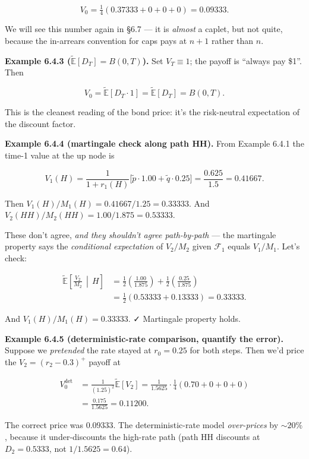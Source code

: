 \documentclass[
  10pt,
  twoside]{book}
\begin{document}
\[V_0 = \tfrac{1}{4}(0.37333 + 0 + 0 + 0) = 0.09333.\]

We will see this number again in §6.7 --- it is \emph{almost} a caplet,
but not quite, because the in-arrears convention for caps pays at
\(n+1\) rather than \(n\).

\textbf{Example 6.4.3 (\(\tilde{\mathbb E}[D_T] = B(0, T)\)).} Set
\(V_T \equiv 1\); the payoff is ``always pay \$1''. Then

\[V_0 = \tilde{\mathbb E}[D_T \cdot 1] = \tilde{\mathbb E}[D_T] = B(0, T).\]

This is the cleanest reading of the bond price: it's the risk-neutral
expectation of the discount factor.

\textbf{Example 6.4.4 (martingale check along path HH).} From Example
6.4.1 the time-1 value at the up node is

\[V_1(H) = \frac{1}{1 + r_1(H)}\bigl[\tilde p \cdot 1.00 + \tilde q \cdot 0.25\bigr] = \frac{0.625}{1.5} = 0.41667.\]

Then \(V_1(H)/M_1(H) = 0.41667 / 1.25 = 0.33333\). And
\(V_2(HH)/M_2(HH) = 1.00 / 1.875 = 0.53333\).

These don't agree, \emph{and they shouldn't agree path-by-path} --- the
martingale property says the \emph{conditional expectation} of
\(V_2/M_2\) given \(\mathcal F_1\) equals \(V_1/M_1\). Let's check:

\[\begin{aligned}
\tilde{\mathbb E}\!\left[\tfrac{V_2}{M_2} \,\middle|\, H\right] &= \tfrac{1}{2}\!\left(\tfrac{1.00}{1.875}\right) + \tfrac{1}{2}\!\left(\tfrac{0.25}{1.875}\right) \\
&= \tfrac{1}{2}(0.53333 + 0.13333) = 0.33333.
\end{aligned}\]

And \(V_1(H)/M_1(H) = 0.33333\). ✓ Martingale property holds.

\textbf{Example 6.4.5 (deterministic-rate comparison, quantify the
error).} Suppose we \emph{pretended} the rate stayed at \(r_0 = 0.25\)
for both steps. Then we'd price the \(V_2 = (r_2 - 0.3)^+\) payoff at

\[\begin{aligned}
V_0^{\text{det}} &= \frac{1}{(1.25)^2}\tilde{\mathbb E}[V_2] = \frac{1}{1.5625} \cdot \tfrac{1}{4}(0.70 + 0 + 0 + 0) \\
&= \frac{0.175}{1.5625} = 0.11200.
\end{aligned}\]

The correct price was \(0.09333\). The deterministic-rate model
\emph{over-prices} by \(\sim 20\%\), because it under-discounts the
high-rate path (path HH discounts at \(D_2 = 0.5333\), not
\(1/1.5625 = 0.64\)).
\end{document}
